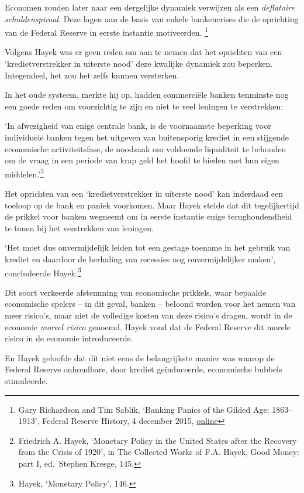 \documentclass[smalldemyvopaper,11pt,twoside,onecolumn,openright,extrafontsizes,hidelinks]{memoir}
\begin{document}
Economen zouden later naar een dergelijke dynamiek verwijzen als een
\emph{deflatoire schuldenspiraal}. Deze lagen aan de basis van enkele
bankencrises die de oprichting van de Federal Reserve in eerste
instantie motiveerden. \footnote{Gary Richardson and Tim Sablik,
  `Banking Panics of the Gilded Age: 1863--1913', Federal Reserve
  History, 4 december 2015,
  \href{https://www.federalreservehistory.org/essays/banking-panics-of-the-gilded-age.}{online}}

Volgens Hayek was er geen reden om aan te nemen dat het oprichten van
een `kredietverstrekker in uiterste nood' deze kwalijke dynamiek zou
beperken. Integendeel, het zou het zelfs kunnen versterken.

In het oude systeem, merkte hij op, hadden commerciële banken tenminste
nog een goede reden om voorzichtig te zijn en niet te veel leningen te
verstrekken:

`In afwezigheid van enige centrale bank, is de voornaamste beperking
voor individuele banken tegen het uitgeven van buitensporig krediet in
een stijgende economische activiteitsfase, de noodzaak om voldoende
liquiditeit te behouden om de vraag in een periode van krap geld het
hoofd te bieden met hun eigen middelen.'\footnote{\hspace{0pt}Friedrich
  A. Hayek, `Monetary Policy in the United States after the Recovery
  from the Crisis of 1920', in The Collected Works of F.A. Hayek, Good
  Money: part I, ed.~Stephen Kresge, 145.}

Het oprichten van een `kredietverstrekker in uiterste nood' kan
inderdaad een toeloop op de bank en paniek voorkomen. Maar Hayek stelde
dat dit tegelijkertijd de prikkel voor banken wegneemt om in eerste
instantie enige terughoudendheid te tonen bij het verstrekken van
leningen.

`Het moet dus onvermijdelijk leiden tot een gestage toename in het
gebruik van krediet en daardoor de herhaling van recessies nog
onvermijdelijker maken', concludeerde Hayek.\footnote{\hspace{0pt}Hayek,
  `Monetary Policy', 146.}

Dit soort verkeerde afstemming van economische prikkels, waar bepaalde
economische spelers -- in dit geval, banken -- beloond worden voor het
nemen van meer risico's, maar niet de volledige kosten van deze risico's
dragen, wordt in de economie \emph{moreel risico} genoemd. Hayek vond
dat de Federal Reserve dit morele risico in de economie introduceerde.

En Hayek geloofde dat dit niet eens de belangrijkste manier was waarop
de Federal Reserve onhoudbare, door krediet geïnduceerde, economische
bubbels stimuleerde.
\end{document}
